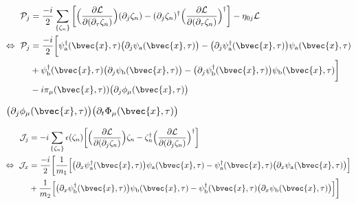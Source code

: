 %
\begin{align}
	\mathcal{P}_{j} &= 
		\frac{-i}{2} \sum\limits_{\{\zeta_{n}\}} \bigg[ 
		\Big(\frac{\partial\mathcal{L}}{\partial(\partial_{\tau}\zeta_{n})}\Big) (\partial_{j}\zeta_{n}) 
		-
		(\partial_{j}\zeta_{n})^{\dag} \Big(\frac{\partial\mathcal{L}}{\partial(\partial_{\tau}\zeta_{n})}\Big)^{\dag}
		\bigg]
		-
		\eta_{0j}\mathcal{L}
		\notag \\
	\Leftrightarrow\ \mathcal{P}_{j} &= 
		\frac{-i}{2} \bigg[
			\psi_{\mathrm{a}}^{\dag}(\bvec{x},\tau) \big(\partial_{j} \psi_{\mathrm{a}}(\bvec{x},\tau)\big)
			- 
			\big(\partial_{j} \psi_{\mathrm{a}}^{\dag}(\bvec{x},\tau)\big) \psi_{\mathrm{a}}(\bvec{x},\tau)
			\\&
			+
			\psi_{\mathrm{b}}^{\dag}(\bvec{x},\tau) \big(\partial_{j} \psi_{\mathrm{b}}(\bvec{x},\tau)\big)
			- 
			\big(\partial_{j} \psi_{\mathrm{b}}^{\dag}(\bvec{x},\tau)\big) \psi_{\mathrm{b}}(\bvec{x},\tau)
		\bigg]
	\\&
	- 
	i\pi_{\mu}(\bvec{x},\tau)) \big(\partial_{j} \phi_{\mu}(\bvec{x},\tau)\big)
\end{align}
%

$\big(\partial_{j} \phi_{\mu}(\bvec{x},\tau)\big) \big(\partial_{t}\Phi_{\mu}(\bvec{x},\tau)\big)$



%
\begin{align}
	\mathcal{J}_{j} &= 
		-i \sum\limits_{\{\zeta_{n}\}} \epsilon(\zeta_{n}) \bigg[
			\Big(\frac{\partial\mathcal{L}}{\partial(\partial_{j}\zeta_{n})}\Big) \zeta_{n}
			-
			\zeta_{n}^{\dag} \Big(\frac{\partial\mathcal{L}}{\partial(\partial_{j}\zeta_{n})}\Big)^{\dag}
		\bigg]
	\notag \\
	\Leftrightarrow\ \mathcal{J}_{x} &=
		\frac{-i}{2} \bigg[
		\frac{1}{m_{1}} \Big[
			\big(\partial_{x} \psi_{\mathrm{a}}^{\dag}(\bvec{x},\tau)\big) \psi_{\mathrm{a}}(\bvec{x},\tau)
			-
			\psi_{\mathrm{a}}^{\dag}(\bvec{x},\tau) \big(\partial_{x} \psi_{\mathrm{a}}(\bvec{x},\tau)\big)
		\Big]
		\notag \\&
		+
		\frac{1}{m_{2}} \Big[
			\big(\partial_{x} \psi_{\mathrm{b}}^{\dag}(\bvec{x},\tau)\big) \psi_{\mathrm{b}}(\bvec{x},\tau)
			-
			\psi_{\mathrm{b}}^{\dag}(\bvec{x},\tau) \big(\partial_{x} \psi_{\mathrm{b}}(\bvec{x},\tau)\big)
		\Big]
		\bigg]
\end{align}
%



